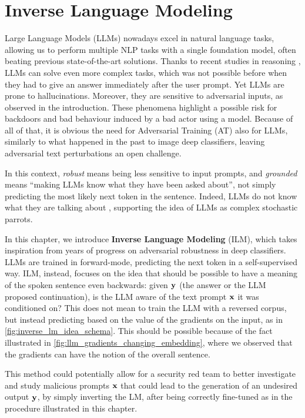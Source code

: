 \documentclass[../thesis.tex]{subfiles}
\begin{document}
\chapter{Inverse Language Modeling}
\label{chap:inversion}

Large Language Models (LLMs) nowadays excel in natural language tasks, allowing us to perform multiple NLP tasks with a single foundation model, often beating previous state-of-the-art solutions. Thanks to recent studies in reasoning \citep{xu2025largereasoningmodelssurvey}, LLMs can solve even more complex tasks, which was not possible before when they had to give an answer immediately after the user prompt.
Yet LLMs are prone to hallucinations. Moreover, they are sensitive to adversarial inputs, as observed in the introduction. These phenomena highlight a possible risk for backdoors and bad behaviour induced by a bad actor using a model.
Because of all of that, it is obvious the need for Adversarial Training (AT) also for LLMs, similarly to what happened in the past to image deep classifiers, leaving adversarial text perturbations an open challenge.

In this context, \emph{robust} means being less sensitive to input prompts, and \emph{grounded} means ``making LLMs know what they have been asked about'', not simply predicting the most likely next token in the sentence.
Indeed, LLMs do not know what they are talking about \citep{guo2024language}, supporting the idea of LLMs as complex stochastic parrots.

In this chapter, we introduce \textbf{Inverse Language Modeling} (ILM), which takes inspiration from years of progress on adversarial robustness in deep classifiers.
LLMs are trained in forward-mode, predicting the next token in a self-supervised way.
ILM, instead, focuses on the idea that should be possible to have a meaning of the spoken sentence even backwards: given $\mathbf{y}$ (the answer or the LLM proposed continuation), is the LLM aware of the text prompt $\mathbf{x}$ it was conditioned on?
This does not mean to train the LLM with a reversed corpus, but instead predicting based on the value of the gradients on the input, as in \cref{fig:inverse_lm_idea_schema}. This should be possible because of the fact illustrated in \cref{fig:llm_gradients_changing_embedding}, where we observed that the gradients can have the notion of the overall sentence.

This method could potentially allow for a security red team to better investigate and study malicious prompts $\mathbf{x}$ that could lead to the generation of an undesired output $\mathbf{y}$, by simply inverting the LM, after being correctly fine-tuned as in the procedure illustrated in this chapter.
\end{document}
